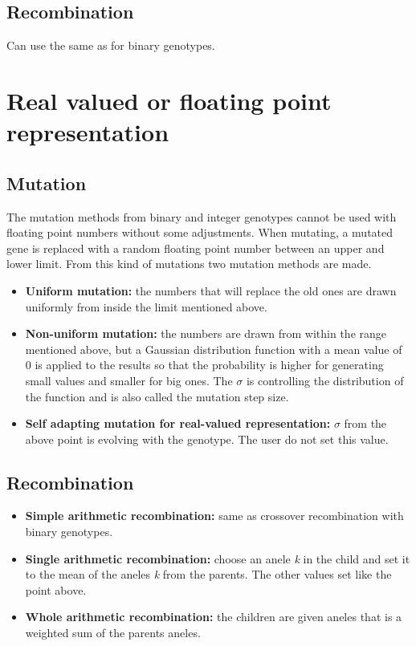 \documentclass{article}
\begin{document}
   \subsection{Recombination} Can use the same as for binary genotypes.
   \section{Real valued or floating point representation}
   \subsection{Mutation} 
   The mutation methods from binary and integer genotypes cannot be used with floating point numbers without some adjustments. When mutating, a mutated gene is replaced with a random floating point number between an upper and lower limit. From this kind of mutations two mutation methods are made.
   \begin{itemize}
   \item \textbf{Uniform mutation:} the numbers that will replace the old ones are drawn uniformly from inside the limit mentioned above.
   \item \textbf{Non-uniform mutation:} the numbers are drawn from within the range mentioned above, but a Gaussian distribution function with a mean value of 0 is applied to the results so that the probability is higher for generating small values and smaller for big ones. The $\sigma$ is controlling the distribution of the function and is also called the mutation step size.
   \item \textbf{Self adapting mutation for real-valued representation:} $\sigma$ from the above point is evolving with the genotype. The user do not set this value.
   \end{itemize}
   \subsection{Recombination}
   \begin{itemize}
   \item \textbf{Simple arithmetic recombination:} same as crossover recombination with binary genotypes.
   \item \textbf{Single arithmetic recombination:} choose an anele \textit{k} in the child and set it to the mean of the aneles \textit{k} from the parents. The other values set like the point above.
   \item \textbf{Whole arithmetic recombination:} the children are given aneles that is a weighted sum of the parents aneles.
   \end{itemize}
\end{document}
